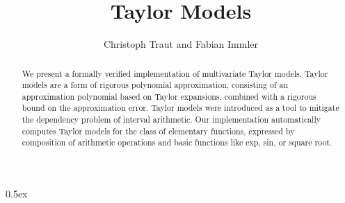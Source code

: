 \documentclass[11pt,a4paper]{article}
\begin{document}
\title{Taylor Models}
\author{Christoph Traut and Fabian Immler}
\maketitle

\begin{abstract}
We present a formally verified implementation of multivariate Taylor models. Taylor models are a
form of rigorous polynomial approximation, consisting of an approximation polynomial based on Taylor
expansions, combined with a rigorous bound on the approximation error. Taylor models were introduced
as a tool to mitigate the dependency problem of interval arithmetic. Our implementation
automatically computes Taylor models for the class of elementary functions, expressed by composition
of arithmetic operations and basic functions like exp, sin, or square root.
\end{abstract}


\tableofcontents

\parindent 0pt\parskip 0.5ex



%
%
\end{document}
